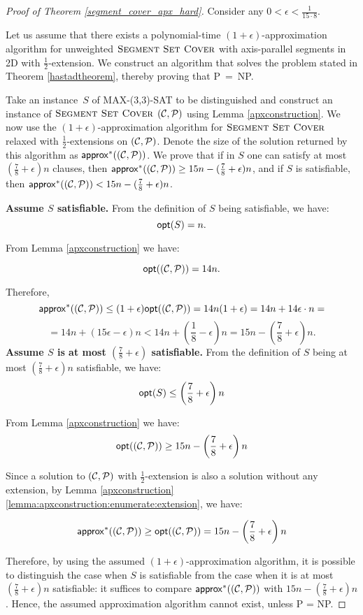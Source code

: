 \begin{proof}[Proof of Theorem \ref{segment_cover_apx_hard}]
Consider any $0 < \epsilon < \frac{1}{15 \cdot 8}$.

Let us assume that there exists a polynomial-time
$(1+\epsilon)$-approximation algorithm
for unweighted $\textsc{Segment Set Cover}$ with axis-parallel segments in 2D
with $\frac{1}{2}$-extension.
We construct an algorithm that solves the problem stated in 
Theorem \ref{hastadtheorem}, thereby proving that P~=~NP.

Take an instance~$S$ of MAX-(3,3)-SAT to be distinguished
and construct an instance of $\textsc{Segment Set Cover}$ $(\mathcal{C}, \mathcal{P})$
using Lemma \ref{apxconstruction}.
We now use the $(1+\epsilon)$-approximation algorithm
for $\textsc{Segment Set Cover}$ relaxed with $\frac{1}{2}$-extensions on $(\mathcal{C}, \mathcal{P})$.
Denote the size of the solution returned by this algorithm as $\mathsf{approx}^{*}((\mathcal{C}, \mathcal{P}))$.
We prove that 
if in $S$
one can satisfy at most $(\frac{7}{8}+\epsilon)n$ clauses,
then $\mathsf{approx}^{*}((\mathcal{C}, \mathcal{P})) \ge 15n - (\frac{7}{8} + \epsilon)n$,
and if $S$ is
satisfiable, then $\mathsf{approx}^{*}((\mathcal{C}, \mathcal{P})) < 15n - (\frac{7}{8} + \epsilon)n$.


\textbf{Assume $S$ satisfiable.}
From the definition of $S$ being satisfiable, we have:
$$\mathsf{opt}(S) = n.$$

From Lemma \ref{apxconstruction} we have:

$$\mathsf{opt}((\mathcal{C}, \mathcal{P})) = 14n.$$

Therefore,
$$\mathsf{approx}^{*}((\mathcal{C}, \mathcal{P})) \le (1+\epsilon)\mathsf{opt}((\mathcal{C}, \mathcal{P})) = 14n(1+\epsilon)
	= 14n + 14\epsilon\cdot n =$$ 
	$$= 14n + (15\epsilon - \epsilon)n < 
  14n + \left(\frac{1}{8} - \epsilon\right)n 
= 15n - \left(\frac{7}{8} + \epsilon\right)n.$$
\textbf{Assume $S$ is at most 
$\left(\frac{7}{8} + \epsilon\right)$ satisfiable.}
From the definition of $S$ being at most 
$\left(\frac{7}{8} + \epsilon\right)n$ satisfiable, we have:
$$\mathsf{opt}(S) \le \left(\frac{7}{8} + \epsilon\right)n$$

From Lemma \ref{apxconstruction} we have:
$$\mathsf{opt}((\mathcal{C}, \mathcal{P})) \ge 15n - \left(\frac{7}{8} + \epsilon\right)n$$

Since a solution to $(\mathcal{C}, \mathcal{P})$ with $\frac{1}{2}$-extension is
also a solution without any extension, by 
Lemma \ref{apxconstruction} \ref{lemma:apxconstruction:enumerate:extension}, we have:

$$\mathsf{approx}^{*}((\mathcal{C}, \mathcal{P})) \ge \mathsf{opt}((\mathcal{C}, \mathcal{P})) = 15n - \left(\frac{7}{8} + \epsilon\right)n$$


Therefore, by using the assumed $(1+\epsilon)$-approximation
algorithm,
it is possible to distinguish the case when
$S$ is satisfiable from the case when it is
at most $(\frac{7}{8} + \epsilon)n$ satisfiable:
it suffices to compare $\mathsf{approx}^{*}((\mathcal{C}, \mathcal{P}))$ with $15n - (\frac{7}{8}+\epsilon)n$.
Hence, the assumed approximation algorithm cannot exist, unless P = NP.
\end{proof}

